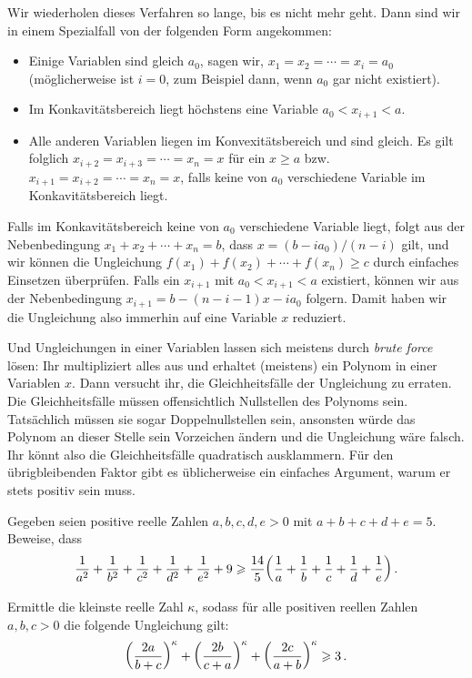 Wir wiederholen dieses Verfahren so lange, bis es nicht mehr geht. Dann sind wir in einem Spezialfall von der folgenden Form angekommen:
\begin{itemize}
	\item Einige Variablen sind gleich $a_0$, sagen wir, $x_1=x_2=\dotsb=x_i=a_0$ (möglicherweise ist $i=0$, zum Beispiel dann, wenn $a_0$ gar nicht existiert).
	\item Im Konkavitätsbereich liegt höchstens eine Variable $a_0<x_{i+1}<a$.
	\item Alle anderen Variablen liegen im Konvexitätsbereich und sind gleich. Es gilt folglich $x_{i+2}=x_{i+3}=\dotsb=x_n=x$ für ein $x\geqslant a$ bzw.\ $x_{i+1}=x_{i+2}=\dotsb=x_n=x$, falls keine von $a_0$ verschiedene Variable im Konkavitätsbereich liegt.
\end{itemize}
Falls im Konkavitätsbereich keine von $a_0$ verschiedene Variable liegt, folgt aus der Nebenbedingung $x_1+x_2+\dotsb+x_n=b$, dass $x=(b-ia_0)/(n-i)$ gilt, und wir können die Ungleichung $f(x_1)+f(x_2)+\dotsb+f(x_n)\geqslant c$ durch einfaches Einsetzen überprüfen. Falls ein $x_{i+1}$ mit $a_0<x_{i+1}<a$ existiert, können wir aus der Nebenbedingung $x_{i+1}=b-(n-i-1)x-ia_0$ folgern. Damit haben wir die Ungleichung also immerhin auf eine Variable $x$ reduziert.

Und Ungleichungen in einer Variablen lassen sich meistens durch \emph{brute force} lösen: Ihr multipliziert alles aus und erhaltet (meistens) ein Polynom in einer Variablen $x$. Dann versucht ihr, die Gleichheitsfälle der Ungleichung zu erraten. Die Gleichheitsfälle müssen offensichtlich Nullstellen des Polynoms sein. Tatsächlich müssen sie sogar Doppelnullstellen sein, ansonsten würde das Polynom an dieser Stelle sein Vorzeichen ändern und die Ungleichung wäre falsch. Ihr könnt also die Gleichheitsfälle quadratisch ausklammern. Für den übrigbleibenden Faktor gibt es üblicherweise ein einfaches Argument, warum er stets positiv sein muss.

\begin{aufgabe*}\label{aufgabe:KaramataSchieben}
	Gegeben seien positive reelle Zahlen $a,b,c,d,e>0$ mit $a+b+c+d+e=5$. Beweise, dass
	\begin{equation*}
		\frac1{a^2}+\frac1{b^2}+\frac1{c^2}+\frac1{d^2}+\frac1{e^2}+9\geqslant \frac{14}5\parens*{\frac1a+\frac1b+\frac1c+\frac1d+\frac1e}\,.
	\end{equation*}
\end{aufgabe*}
\begin{aufgabe*}[**]\label{aufgabe:log3log2}
	Ermittle die kleinste reelle Zahl $\kappa$, sodass für alle positiven reellen Zahlen $a,b,c>0$ die folgende Ungleichung gilt:
	\begin{equation*}
		\parens*{\frac{2a}{b+c}}^\kappa+\parens*{\frac{2b}{c+a}}^\kappa+\parens*{\frac{2c}{a+b}}^\kappa\geqslant 3\,.
	\end{equation*}
\end{aufgabe*}

